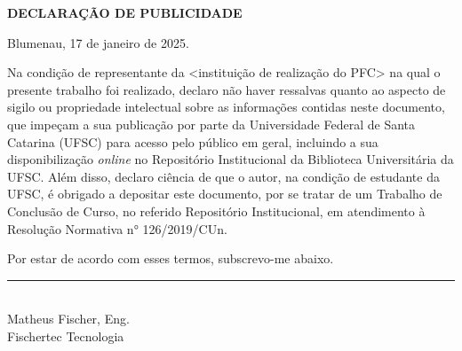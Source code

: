 
\begin{center}
	\textbf{DECLARAÇÃO DE PUBLICIDADE}
\end{center}


Blumenau, 17 de janeiro de 2025.

\vspace{1cm}

Na condição de representante da <instituição de realização do PFC> na qual o presente trabalho foi realizado, declaro não haver ressalvas quanto ao aspecto de sigilo ou propriedade intelectual sobre as informações contidas neste documento, que impeçam a sua publicação por parte da Universidade Federal de Santa Catarina (UFSC) para acesso pelo público em geral, incluindo a sua disponibilização \emph{online} no Repositório Institucional da Biblioteca Universitária da UFSC. Além disso, declaro ciência de que o autor, na condição de estudante da UFSC, é obrigado a depositar este documento, por se tratar de um Trabalho de Conclusão de Curso, no referido Repositório Institucional, em atendimento à Resolução Normativa n° 126/2019/CUn.

Por estar de acordo com esses termos, subscrevo-me abaixo.

\vspace{15mm}

\begin{center}
	\rule{7cm}{0.7pt} \\
	Matheus Fischer, Eng. \\
	Fischertec Tecnologia
\end{center}

\cleardoublepage



